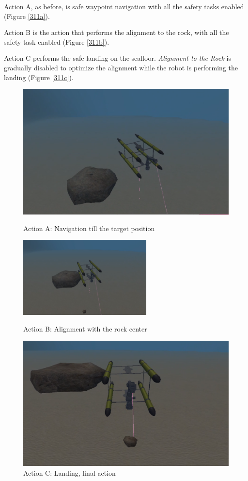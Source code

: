 \documentclass{article}
\begin{document}
\begin{description}
 \item Action A, as before, is safe waypoint navigation with all the safety tasks enabled (Figure \ref{311a}). 
 \item Action B is the action that performs the alignment to the rock, with all the safety task enabled (Figure \ref{311b}). 
 \item Action C performs the safe landing on the seafloor. \textit{Alignment to the Rock} is gradually disabled to optimize the alignment while the robot is performing the landing (Figure \ref{311c}).
\end{description}



\begin{figure}[htp]
\centering
\includegraphics[width=.6\textwidth]{312_Nav.png}\caption{Action A: Navigation till the target position}\label{311a}
\vspace{5px}
\centering
\includegraphics[width=0.6\textwidth]{312_Alr.png}\caption{Action B: Alignment with the rock center}\label{311b}
\vspace{5px}
\centering
\includegraphics[width=.6\textwidth]{312_Land.png}\caption{Action C: Landing, final action}\label{311c}
\label{fig:missionphase3}
\vspace{5px}
\end{figure}
\clearpage
\end{document}
